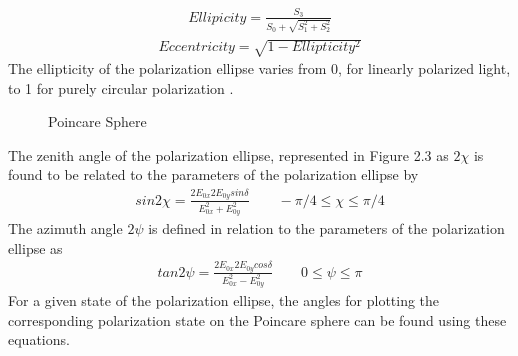 %
\begin{align}
    Ellipicity = \frac{S_3}{S_0+\sqrt{S_1^2+S_2^2 }}
\end{align}
\begin{align}
    Eccentricity= \sqrt{1-Ellipticity^2}
\end{align}
%
The ellipticity of the polarization ellipse varies from 0, for linearly polarized light, to 1 for purely circular polarization \cite{chipman}.
%
%
\begin{figure}[!htb]
    \begin{center}
    \end{center}
    \caption{Poincare Sphere}
    \label{fig:polarization}
\end{figure}
%
The zenith angle of the polarization ellipse, represented in Figure 2.3 as $2\chi$ is found to be related to the parameters of the polarization ellipse by
%
\begin{align}
    sin2\chi = \frac{2E_{0x}2E_{0y}sin\delta}{E_{0x}^2+E_{0y}^2}\qquad -\pi / 4 \leq \chi \leq \pi / 4
\end{align}
%
The azimuth angle $2\psi$ is defined in relation to the parameters of the polarization ellipse as
%
\begin{align}
    tan2\psi = \frac{2E_{0x}2E_{0y}cos\delta}{E_{0x}^2-E_{0y}^2}\qquad 0 \leq \psi \leq \pi
\end{align}
%
For a given state of the polarization ellipse, the angles for plotting the corresponding polarization state on the Poincare sphere can be found using these equations\cite{spieellipse}.
